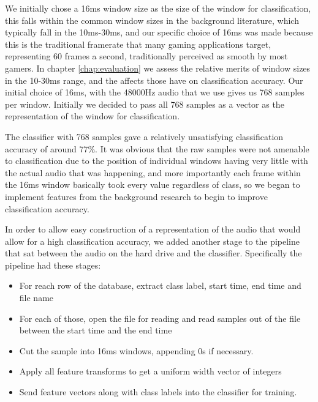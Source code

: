 \documentclass[ %
                    author={Sam Phippen},
                supervisor={Dr. Rafal Bogacz},
                     title={Real time voice activity detectors in noisy personal computing environments},
                  subtitle={},
                    degree={MEng},
                      year={2012} ]{thesis}
\begin{document}
We initially chose a 16ms window size as the size of the window for
classification, this falls within the common window sizes in the background
literature, which typically fall in the 10ms-30ms, and our specific choice of
16ms was made because this is the traditional framerate that many gaming
applications target, representing 60 frames a second, traditionally perceived
as smooth by most gamers. In chapter \ref{chap:evaluation} we assess the
relative merits of window sizes in the 10-30ms range, and the affects those
have on classification accuracy. Our initial choice of 16ms, with the 48000Hz
audio that we use gives us 768 samples per window. Initially we decided to pass
all 768 samples as a vector as the representation of the window for
classification.

The classifier with 768 samples gave a relatively unsatisfying classification
accuracy of around 77\%. It was obvious that the raw samples were not amenable
to classification due to the position of individual windows having very little
with the actual audio that was happening, and more importantly each frame
within the 16ms window basically took every value regardless of class, so we
began to implement features from the background research to begin to improve
classification accuracy.

In order to allow easy construction of a representation of the audio that would
allow for a high classification accuracy, we added another stage to the
pipeline that sat between the audio on the hard drive and the classifier.
Specifically the pipeline had these stages:

\begin{itemize}

    \item For reach row of the database, extract class label, start time, end time
        and file name

    \item For each of those, open the file for reading and read samples out of
        the file between the start time and the end time

    \item Cut the sample into 16ms windows, appending 0s if necessary.

    \item Apply all feature transforms to get a uniform width vector of integers

    \item Send feature vectors along with class labels into the classifier for
        training.

\end{itemize}
\end{document}
